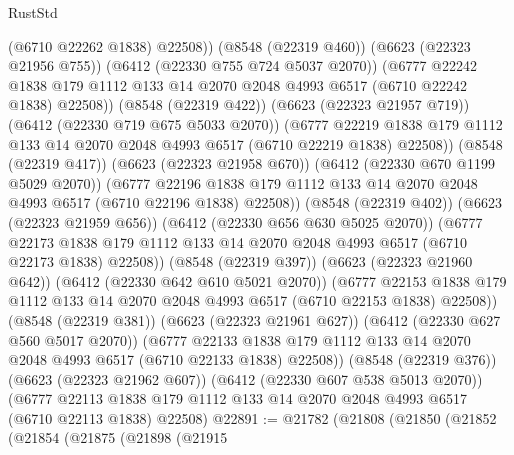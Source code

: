 \begin{lexlean}{RustStd}
\begin{coremodule}
                    (@6710 @22262 @1838)
                    @22508))
                (@8548 (@22319 @460))
                (@6623 (@22323 @21956 @755))
                (@6412 (@22330 @755 @724 @5037 @2070))
                (@6777
                  @22242
                  @1838
                  @179
                  @1112
                  @133
                  @14
                  @2070
                  @2048
                  @4993
                  @6517
                  (@6710 @22242 @1838)
                  @22508))
              (@8548 (@22319 @422))
              (@6623 (@22323 @21957 @719))
              (@6412 (@22330 @719 @675 @5033 @2070))
              (@6777
                @22219
                @1838
                @179
                @1112
                @133
                @14
                @2070
                @2048
                @4993
                @6517
                (@6710 @22219 @1838)
                @22508))
            (@8548 (@22319 @417))
            (@6623 (@22323 @21958 @670))
            (@6412 (@22330 @670 @1199 @5029 @2070))
            (@6777
              @22196
              @1838
              @179
              @1112
              @133
              @14
              @2070
              @2048
              @4993
              @6517
              (@6710 @22196 @1838)
              @22508))
          (@8548 (@22319 @402))
          (@6623 (@22323 @21959 @656))
          (@6412 (@22330 @656 @630 @5025 @2070))
          (@6777
            @22173
            @1838
            @179
            @1112
            @133
            @14
            @2070
            @2048
            @4993
            @6517
            (@6710 @22173 @1838)
            @22508))
        (@8548 (@22319 @397))
        (@6623 (@22323 @21960 @642))
        (@6412 (@22330 @642 @610 @5021 @2070))
        (@6777
          @22153
          @1838
          @179
          @1112
          @133
          @14
          @2070
          @2048
          @4993
          @6517
          (@6710 @22153 @1838)
          @22508))
      (@8548 (@22319 @381))
      (@6623 (@22323 @21961 @627))
      (@6412 (@22330 @627 @560 @5017 @2070))
      (@6777 @22133 @1838 @179 @1112 @133 @14 @2070 @2048 @4993 @6517 (@6710 @22133 @1838) @22508))
    (@8548 (@22319 @376))
    (@6623 (@22323 @21962 @607))
    (@6412 (@22330 @607 @538 @5013 @2070))
    (@6777 @22113 @1838 @179 @1112 @133 @14 @2070 @2048 @4993 @6517 (@6710 @22113 @1838) @22508)
@22891 := @21782
    (@21808
      (@21850
        (@21852
          (@21854
            (@21875
              (@21898
                (@21915

\end{coremodule}
\end{lexlean}
